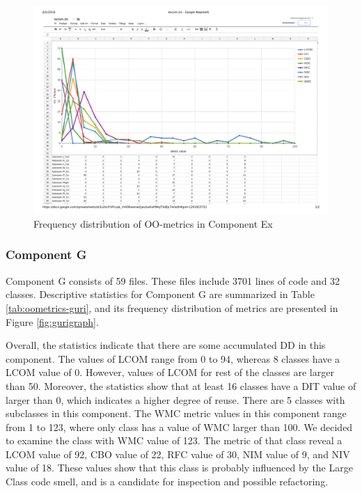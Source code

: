 \begin{landscape}
\setlength\LTleft{-.5in}
	\begin{figure}
	\centering
	\includegraphics[width=\textwidth]{images/pdf/ex.pdf}
	\caption{Frequency distribution of OO-metrics in Component Ex}
	\label{fig:exgraph}
	\end{figure}
\end{landscape}






\subsubsection{Component G}
Component G consists of 59 files. These files include 3701 lines of code and 32 classes. Descriptive statistics for Component G are summarized in Table \ref{tab:oometrics-guri}, and its frequency distribution of metrics are presented in Figure \ref{fig:gurigraph}. 

Overall, the statistics indicate that there are some accumulated DD in this component. The values of LCOM range from 0 to 94, whereas 8 classes have a LCOM value of 0. However, values of LCOM for rest of the classes are larger than 50. Moreover, the statistics show that at least 16 classes have a DIT value of larger than 0, which indicates a higher degree of reuse. There are 5 classes with subclasses in this component. The WMC metric values in this component range from 1 to 123, where only class has a value of WMC larger than 100. We decided to examine the class with WMC value of 123. The metric of that class reveal a LCOM value of 92, CBO value of 22, RFC value of 30, NIM value of 9, and NIV value of 18. These values show that this class is probably influenced by the Large Class code smell, and is a candidate for inspection and possible refactoring.



